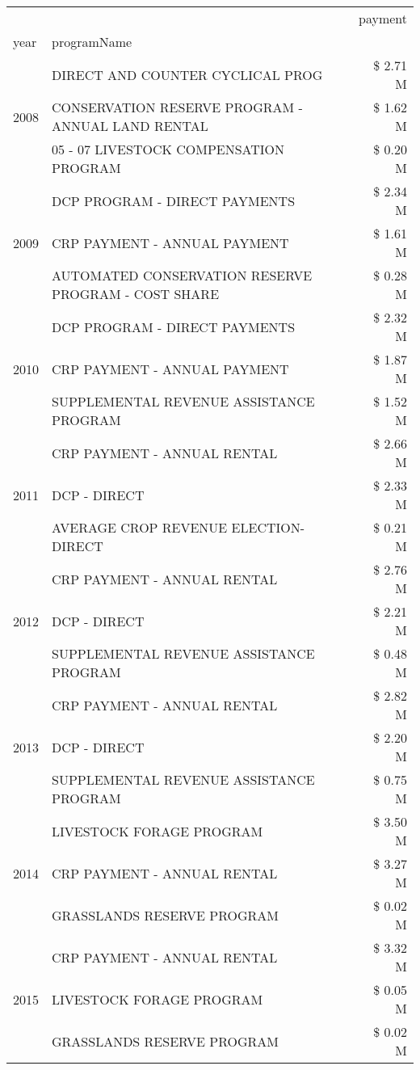 \begin{tabular}{llr}
\toprule
 &  & payment \\
year & programName &  \\
\midrule
\multirow[t]{3}{*}{2008} & DIRECT AND COUNTER CYCLICAL PROG & \$ 2.71 M \\
 & CONSERVATION RESERVE PROGRAM - ANNUAL LAND RENTAL & \$ 1.62 M \\
 & 05 - 07 LIVESTOCK COMPENSATION PROGRAM & \$ 0.20 M \\
\cline{1-3}
\multirow[t]{3}{*}{2009} & DCP PROGRAM - DIRECT PAYMENTS & \$ 2.34 M \\
 & CRP PAYMENT - ANNUAL PAYMENT & \$ 1.61 M \\
 & AUTOMATED CONSERVATION RESERVE PROGRAM - COST SHARE & \$ 0.28 M \\
\cline{1-3}
\multirow[t]{3}{*}{2010} & DCP PROGRAM - DIRECT PAYMENTS & \$ 2.32 M \\
 & CRP PAYMENT - ANNUAL PAYMENT & \$ 1.87 M \\
 & SUPPLEMENTAL REVENUE ASSISTANCE PROGRAM & \$ 1.52 M \\
\cline{1-3}
\multirow[t]{3}{*}{2011} & CRP PAYMENT - ANNUAL RENTAL & \$ 2.66 M \\
 & DCP - DIRECT & \$ 2.33 M \\
 & AVERAGE CROP REVENUE ELECTION-DIRECT & \$ 0.21 M \\
\cline{1-3}
\multirow[t]{3}{*}{2012} & CRP PAYMENT - ANNUAL RENTAL & \$ 2.76 M \\
 & DCP - DIRECT & \$ 2.21 M \\
 & SUPPLEMENTAL REVENUE ASSISTANCE PROGRAM & \$ 0.48 M \\
\cline{1-3}
\multirow[t]{3}{*}{2013} & CRP PAYMENT - ANNUAL RENTAL & \$ 2.82 M \\
 & DCP - DIRECT & \$ 2.20 M \\
 & SUPPLEMENTAL REVENUE ASSISTANCE PROGRAM & \$ 0.75 M \\
\cline{1-3}
\multirow[t]{3}{*}{2014} & LIVESTOCK FORAGE PROGRAM & \$ 3.50 M \\
 & CRP PAYMENT - ANNUAL RENTAL & \$ 3.27 M \\
 & GRASSLANDS RESERVE PROGRAM & \$ 0.02 M \\
\cline{1-3}
\multirow[t]{3}{*}{2015} & CRP PAYMENT - ANNUAL RENTAL & \$ 3.32 M \\
 & LIVESTOCK FORAGE PROGRAM & \$ 0.05 M \\
 & GRASSLANDS RESERVE PROGRAM & \$ 0.02 M \\

\end{tabular}
